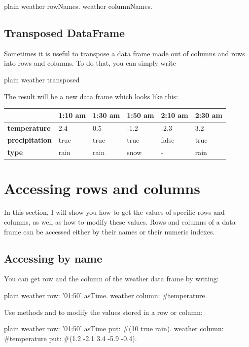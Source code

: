 \documentclass[10pt,twoside,english]{_support/latex/sbabook/sbabook}
\begin{document}
\begin{displaycode}{plain}
weather rowNames.
weather columnNames.
\end{displaycode}
\subsection{Transposed DataFrame}
Sometimes it is useful to transpose a data frame made out of columns and rows into rows and columns. To do that, you can simply write

\begin{displaycode}{plain}
weather transposed
\end{displaycode}

The result will be a new data frame which looks like this:

\begin{tabular}{llllll}
\toprule
 & \textbf{1:10 am} & \textbf{1:30 am} & \textbf{1:50 am} & \textbf{2:10 am} & \textbf{2:30 am} \\
\midrule
\textbf{temperature} & 2.4 & 0.5 & -1.2 & -2.3 & 3.2 \\
\textbf{precipitation} & true & true & true & false & true \\
\textbf{type} & rain & rain & snow & - & rain \\
\bottomrule
\end{tabular}
\section{Accessing rows and columns}
In this section, I will show you how to get the values of specific rows and columns, as well as how to modify these values. Rows and columns of a data frame can be accessed either by their names or their numeric indexes.
\subsection{Accessing by name}\label{secAccessingByName}
You can get row  and the column  of the weather data frame by writing:

\begin{displaycode}{plain}
weather row: '01:50' asTime.
weather column: #temperature.
\end{displaycode}

Use methods  and  to modify the values stored in a row or column:

\begin{displaycode}{plain}
weather row: '01:50' asTime put: #(10 true rain).
weather column: #temperature put: #(1.2 -2.1 3.4 -5.9 -0.4).
\end{displaycode}
\end{document}
